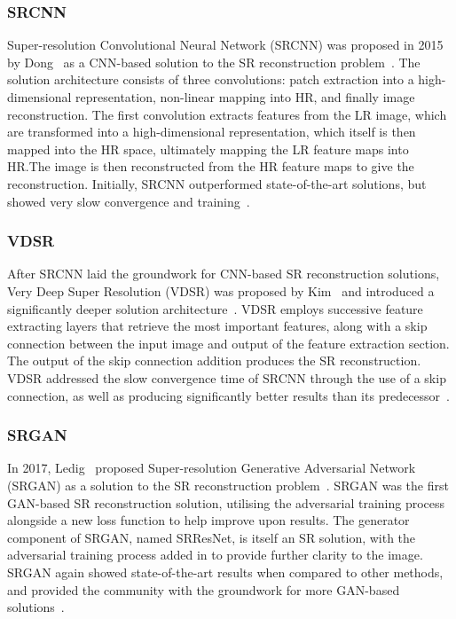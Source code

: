 \subsubsection{SRCNN}
Super-resolution Convolutional Neural Network (SRCNN) was proposed in 2015 by Dong \etal\ as a CNN-based solution to the SR reconstruction problem~\cite{srcnn}. The solution architecture consists of three convolutions: patch extraction into a high-dimensional representation, non-linear mapping into HR, and finally image reconstruction. The first convolution extracts features from the LR image, which are transformed into a high-dimensional representation, which itself is then mapped into the HR space, ultimately mapping the LR feature maps into HR.\@ The image is then reconstructed from the HR feature maps to give the reconstruction. Initially, SRCNN outperformed state-of-the-art solutions, but showed very slow convergence and training~\cite{srcnn, vdsr}.

\subsubsection{VDSR}
After SRCNN laid the groundwork for CNN-based SR reconstruction solutions, Very Deep Super Resolution (VDSR) was proposed by Kim \etal\ and introduced a significantly deeper solution architecture~\cite{vdsr}. VDSR employs successive feature extracting layers that retrieve the most important features, along with a skip connection between the input image and output of the feature extraction section. The output of the skip connection addition produces the SR reconstruction. VDSR addressed the slow convergence time of SRCNN through the use of a skip connection, as well as producing significantly better results than its predecessor~\cite{vdsr}.

\subsubsection{SRGAN}
In 2017, Ledig \etal\ proposed Super-resolution Generative Adversarial Network (SRGAN) as a solution to the SR reconstruction problem~\cite{srgan}. SRGAN was the first GAN-based SR reconstruction solution, utilising the adversarial training process alongside a new loss function to help improve upon results. The generator component of SRGAN, named SRResNet, is itself an SR solution, with the adversarial training process added in to provide further clarity to the image. SRGAN again showed state-of-the-art results when compared to other methods, and provided the community with the groundwork for more GAN-based solutions~\cite{srgan}.


